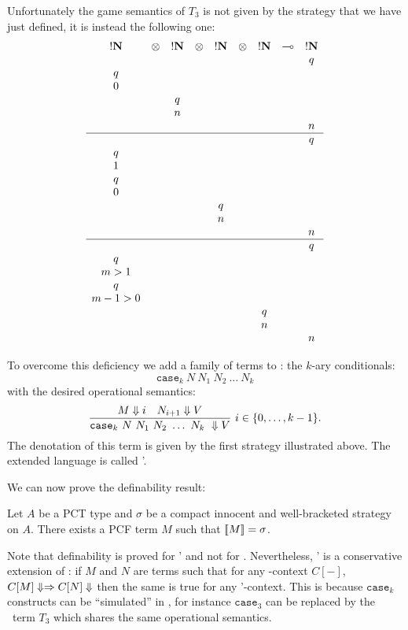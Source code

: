 Unfortunately the game semantics of $T_3$ is not given by the
strategy that we have just defined, it is instead the following one:
$$
\begin{array}{ccccccccc}
!\bf N & \otimes & !\bf N & \otimes & !\bf N & \otimes & !\bf N & \multimap & !\bf N \\
&&&&&&&&q \\
q \\
0 \\
&& q \\
&& n \\
&&&&&&&&n \\
\hline
&&&&&&&&q \\
q \\
1 \\
q \\
0 \\
&&&& q \\
&&&& n \\
&&&&&&&&n \\
\hline
&&&&&&&&q \\
q \\
m>1 \\
q \\
m-1>0 \\
&&&&&& q \\
&&&&&& n \\
&&&&&&&&n \\
\end{array}
$$

To overcome this deficiency we add a family of terms to \pcf: the $k$-ary conditionals:
$$ \texttt{case}_k\ N\ N_1\ N_2\ \ldots\ N_k$$
with the desired operational semantics:
$$ \frac{\displaystyle M \Downarrow i \quad N_{i+1} \Downarrow V}{\texttt{case}_k\ N\ N_1\ N_2\ \ldots\ N_k\ \Downarrow V}\ i \in \{0, \ldots,k-1\}.$$
The denotation of this term is given by the first strategy illustrated above.
The extended language is called \pcf'.

We can now prove the definability result:
\begin{prop}[Definability]
\label{prop:definability} Let $A$ be a PCT type and $\sigma$ be a compact innocent and well-bracketed
strategy on $A$. There exists a PCF term $M$ such that ${[\![ M ]\!]} = \sigma$.
\end{prop}

Note that definability is proved for \pcf' and not for \pcf.
Nevertheless, \pcf' is a conservative extension of \pcf: if $M$ and
$N$ are terms such that for any \pcf-context $C[-]$, $C[M] \Downarrow
\Rightarrow C[N] \Downarrow$ then the same is true for any \pcf'-context. This
is because $\texttt{case}_k$ constructs can be ``simulated'' in
\pcf, for instance $\texttt{case}_3$ can be replaced by the \pcf\
term $T_3$ which shares the same operational semantics.

